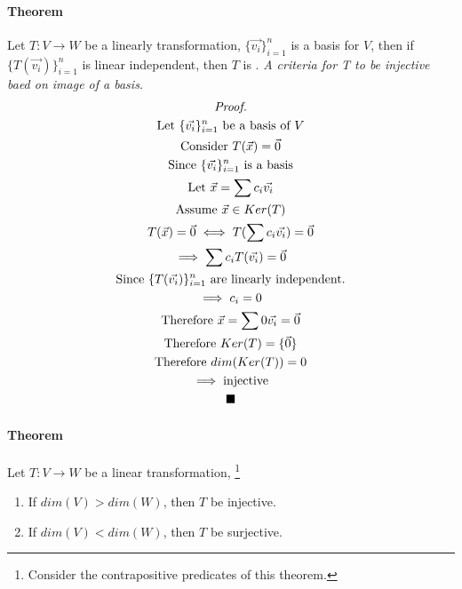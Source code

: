 \documentclass[11pt]{article}
\newcommand{\theorem}[0]{\paragraph{Theorem}}
\newcommand{\tx}[1]{\text{{#1}}}
\begin{document}
 	\theorem Let $T: V \to W$ be a linearly transformation, $\{\vec{v_i}\}_{i=1}^n$ is a basis for $V$, then if $\{T(\vec{v_i})\}_{i=1}^n$ is linear independent, then $T$ is .
 	\newline \emph{A criteria for T to be injective baed on image of a basis.}
 	\begin{multline*}
 	\emph{Proof.} \\
 		\text{Let } \{\vec{v_i}\}_{i=1}^n \text{ be a basis of $V$} \\
 		\text{Consider } T(\vec{x}) = \vec{0} \\
 		\text{Since }  \{\vec{v_i}\}_{i=1}^n \text{ is a basis} \\
 		\text{Let } \vec{x} = \sum{c_i\vec{v_i}} \\
 		\tx{Assume } \vec{x} \in Ker(T) \\
 		T(\vec{x}) = \vec{0} \iff T(\sum{c_i\vec{v_i}}) = \vec{0} \\
 		\implies \sum{c_iT(\vec{v_i})} = \vec{0} \\
 		\tx{Since }\{T(\vec{v_i})\}_{i=1}^n \tx{ are linearly independent.}\\
 		\implies c_i = 0 \\
 		\tx{Therefore } \vec{x} = \sum{0\vec{v_i}} = \vec{0} \\
 		\text{Therefore } Ker(T) = \{\vec{0}\} \\
 		\text{Therefore } dim(Ker(T)) = 0\\
 		\implies \text{injective} \\
 		\blacksquare
 	\end{multline*}

	\paragraph{Theorem} Let $T: V \to W$ be a linear transformation, \footnote{Consider the contrapositive predicates of this theorem.}
	\begin{enumerate}
		\item If $dim(V) > dim(W)$, then $T$  be injective.
		\item If $dim(V) < dim(W)$, then $T$  be surjective.
	\end{enumerate}
\end{document}
